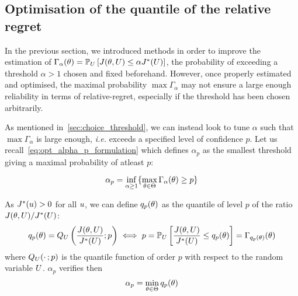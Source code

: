 \documentclass[../../Main_ManuscritThese.tex]{subfiles}
\begin{document}


\clearpage

\subsection{Optimisation of the quantile of the relative regret}
\label{sec:quantile_rr}
In the previous section, we introduced methods in order to improve the
estimation of
$\Gamma_{\alpha}(\theta)= \mathbb{P}_{U}\left[J(\theta, U) \leq \alpha
  J^*(U)\right]$, the probability of exceeding a threshold
$\alpha> 1$ chosen and fixed beforehand.
However, once properly estimated and optimised, the maximal
probability $\max \Gamma_{\alpha}$ may not ensure a large enough
reliability in terms of relative-regret, especially if the threshold
has been chosen arbitrarily.


As mentioned in~\cref{sec:choice_threshold}, we can instead look to tune
$\alpha$ such that $\max \Gamma_{\alpha}$ is large enough, \emph{i.e.}
exceeds a specified level of confidence
$p$. %
Let us recall~\cref{eq:opt_alpha_p_formulation} which defines
$\alpha_p$ as the smallest threshold giving a maximal probability of
atleast $p$:

\begin{equation}
  \label{eq:alpha_p_inf_formation}
  \alpha_p = \inf_{\alpha \geq 1}\{\max_{\theta \in \Theta}\Gamma_{\alpha}(\theta)\geq p \}
\end{equation}

As $J^*(u) > 0$ for all $u$, we can define $q_{p}(\theta)$ as the quantile of level $p$ of the ratio $J(\theta, U) / J^*(U)$:
\begin{align}
  \label{eq:qp_definition}
       q_{p}(\theta)= Q_{U}\left(\frac{J(\theta, U)}{J^*(U)};p\right) \iff  p  = \mathbb{P}_{U}\left[\frac{J(\theta, U)}{J^*(U)} \leq q_{p}(\theta)\right] = \Gamma_{q_p(\theta)}(\theta)
\end{align}
where $Q_{U}(\cdot\,;p)$ is the quantile function of order $p$ with respect to the random variable $U$.
$\alpha_p$ verifies then
\begin{equation}
  \label{eq:alpha_p_min}
\alpha_p = \min_{\theta\in\Theta} q_p(\theta)
\end{equation}
\end{document}
